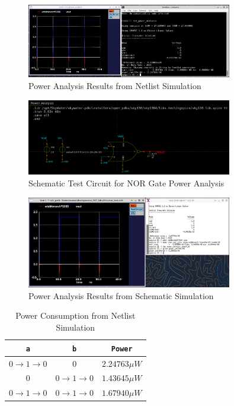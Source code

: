 \documentclass{article}
\begin{document}
	\begin{figure}[H]
		\centerline{\includegraphics[width=0.8\textwidth]{nor_power_analysis.png}}
		\caption{Power Analysis Results from Netlist Simulation}
		\label{fig::nor_power_analysis}
	\end{figure}
	
	\begin{figure}[H]
		\centerline{\includegraphics[width=0.8\textwidth]{nor_power_analysis_test_circuit.png}}
		\caption{Schematic Test Circuit for NOR Gate Power Analysis}
		\label{fig::nor_power_analysis_test_circuit_schem}
	\end{figure}
	
	\begin{figure}[H]
		\centerline{\includegraphics[width=0.8\textwidth]{nor_power_analysis_schem.png}}
		\caption{Power Analysis Results from Schematic Simulation}
		\label{fig::nor_power_analysis_schem}
	\end{figure}
	
	\begin{table}[H]
	\begin{center}
	\caption{Power Consumption from Netlist Simulation}
	\label{table::nor_gate_power_analysis}
	\begin{tabular}{| c | c | c |}
		\hline
		\texttt{a} & \texttt{b} & \texttt{Power}\\
		\hline	
		$0 \rightarrow 1 \rightarrow 0$ & $0$ & $2.24763{\mu}W$ \\
		\hline	
		$0$ & $0 \rightarrow 1 \rightarrow 0$ & $1.43645{\mu}W$ \\
		\hline	
		$0 \rightarrow 1 \rightarrow 0$ & $0 \rightarrow 1 \rightarrow 0$ & $1.67940{\mu}W$\\
		\hline
	\end{tabular}
	\end{center}
	\end{table}
	
\end{document}
